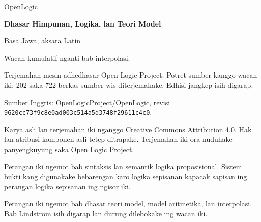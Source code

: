 \documentclass[11pt,openany,a4paper]{memoir}
\begin{document}
\begin{titlingpage}
\raggedright
{\sffamily\Large OpenLogic\par}
\vspace{18mm}
{\sffamily\bfseries\Huge Dhasar Himpunan, Logika, lan Teori Model\par}
\vspace{6mm}
{\Large Basa Jawa, aksara Latin\par}
\vspace{18mm}
{\large Wacan kumulatif nganti bab interpolasi.\par}
\vfill
Terjemahan mesin adhedhasar Open Logic Project.
Potret sumber kanggo wacan iki: 202 saka 722 berkas sumber wis diterjemahake.
Edhisi jangkep isih digarap.
\par\medskip
Sumber Inggris: OpenLogicProject/OpenLogic, revisi
\texttt{9620cc73f9c8e0ad003c514a5d3748f29611c4c0}.
\par\medskip
Karya asli lan terjemahan iki nganggo
\href{https://creativecommons.org/licenses/by/4.0/}{Creative Commons Attribution 4.0}.
Hak lan atribusi komponen asli tetep ditrapake.
Terjemahan iki ora nuduhake panyengkuyung saka Open Logic Project.
\end{titlingpage}
\pagestyle{plain}

\clearpage
\tableofcontents*


\begin{editorial}
Perangan iki ngemot bab sintaksis lan semantik logika proposisional.
Sistem bukti kang digunakake bebarengan karo logika sepisanan
kapacak sapisan ing perangan logika sepisanan ing ngisor iki.
\end{editorial}
\OLEndPartHook


\begin{editorial}
Perangan iki ngemot bab dhasar teori model, model aritmetika,
lan interpolasi. Bab Lindstr\"om isih digarap lan durung
dilebokake ing wacan iki.
\end{editorial}
\OLEndPartHook




\end{document}

